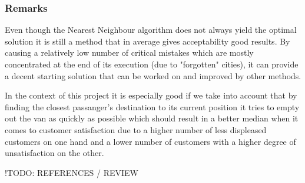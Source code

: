 \subsubsection{Remarks}
Even though the Nearest Neighbour algorithm does not always yield the optimal solution it is still a method that in average gives acceptability good results.
By causing a relatively low number of critical mistakes which are mostly concentrated at the end of its execution (due to "forgotten" cities), it can provide a decent starting solution that can be worked on and improved by other methods.\par
In the context of this project it is especially good if we take into account that by finding the closest passanger's destination to its current position it tries to empty out the van as quickly as possible
which should result in a better median when it comes to customer satisfaction due to a higher number of less displeased customers on one hand and a lower number of customers with a higher degree of unsatisfaction on the other.
\par!TODO: REFERENCES / REVIEW


